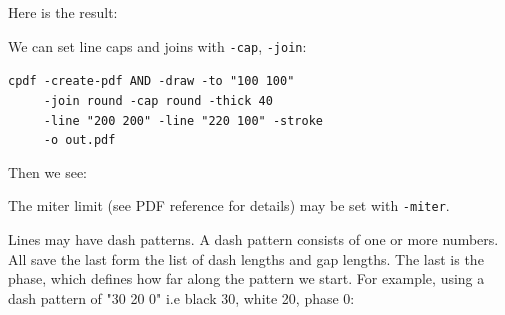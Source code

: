 \documentclass{book}
\begin{document}
\noindent Here is the result:

\bigskip
{}
\bigskip

\noindent We can set line caps and joins with \texttt{-cap}, \texttt{-join}:

\begin{framed}
 \noindent\small\verb?cpdf -create-pdf AND -draw -to "100 100"?\\
 \noindent\small\verb?     -join round -cap round -thick 40?\\
 \noindent\small\verb?     -line "200 200" -line "220 100" -stroke?\\
 \noindent\small\verb?     -o out.pdf?
\end{framed}

\noindent Then we see:

\bigskip
{}
\bigskip

\noindent The miter limit (see PDF reference for details) may be set with \texttt{-miter}.

Lines may have dash patterns. A dash pattern consists of one or more numbers. All save the last form the list of dash lengths and gap lengths. The last is the phase, which defines how far along the pattern we start. For example, using a dash pattern of "30 20 0" i.e black 30, white 20, phase 0:
\end{document}
